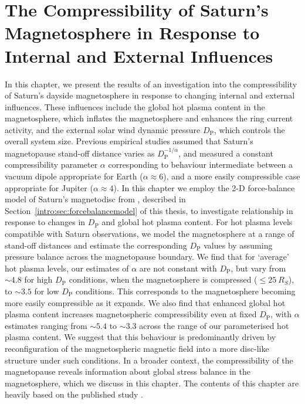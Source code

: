 \chapter[The Compressibility of Saturn's Magnetosphere]{The Compressibility of Saturn's Magnetosphere in Response to Internal and External Influences}
\label{chap:compress}

In this chapter, we present the results  of an investigation into the compressibility of Saturn's dayside magnetosphere in response to changing internal  and external influences. These influences include the global hot plasma content in the magnetosphere, which inflates the magnetosphere and  enhances the ring current activity, and the external solar wind dynamic pressure $D_\mathrm{P}$, which controls the overall system size. Previous empirical studies assumed that Saturn's magnetopause stand-off distance varies as $D_\mathrm{P}^{-1/\alpha}$, and measured a constant compressibility parameter $\alpha$ corresponding to behaviour intermediate between a vacuum dipole appropriate for Earth ($\alpha \approx 6$), and a more easily compressible case appropriate for Jupiter ($\alpha \approx 4$). In this chapter we employ the 2-D force-balance model of Saturn's magnetodisc from \citet{achilleos2010a}, described in Section~\ref{intro:sec:forcebalancemodel} of this thesis, to investigate relationship in response to changes in $D_\mathrm{P}$ and global hot plasma content. For hot plasma levels compatible with Saturn observations, we model the magnetosphere at a range of stand-off distances and estimate the corresponding $D_\mathrm{P}$ values by assuming pressure balance across the magnetopause boundary. We find that for `average' hot plasma levels, our estimates of $\alpha$ are not constant with $D_\mathrm{P}$, but vary from ${\sim}4.8$ for high $D_\mathrm{P}$ conditions, when the magnetosphere is compressed (${\leq}\SI{25}{R_S}$), to ${\sim}3.5$ for low $D_\mathrm{P}$ conditions. This corresponds to the magnetosphere becoming more easily compressible as it expands. We also find that enhanced global hot plasma content increases magnetospheric compressibility even at fixed $D_\mathrm{P}$, with $\alpha$ estimates ranging from ${\sim}5.4$ to ${\sim}3.3$ across the range of our parameterised hot plasma content. We suggest that this behaviour is predominantly driven by reconfiguration of the magnetospheric magnetic field into a more disc-like structure under such conditions. In a broader context, the compressibility of the magnetopause reveals information about global stress balance in the magnetosphere, which we discuss in this chapter. The contents of this chapter are heavily based on the published study \citet{sorba2017}.

